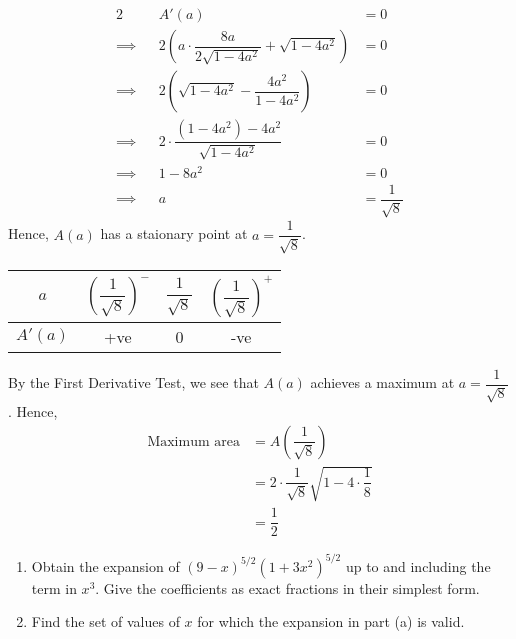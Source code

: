 \documentclass{jhwhw}
\begin{document}
        \begin{alignat*}{2}
            &&A'(a) &= 0\\
            \implies&&2\left(a \cdot \dfrac{8a}{2\sqrt{1-4a^2}} + \sqrt{1 - 4a^2}\right) &= 0\\
            \implies&&2\left(\sqrt{1 - 4a^2} - \dfrac{4a^2}{1-4a^2}\right) &= 0\\
            \implies&&2 \cdot \dfrac{\left(1-4a^2\right) - 4a^2}{\sqrt{1-4a^2}} &= 0\\
            \implies&&1 - 8a^2 &= 0\\
            \implies&&a &= \dfrac1{\sqrt8}
        \end{alignat*}
        Hence, $A(a)$ has a staionary point at $a = \dfrac1{\sqrt8}$.
        \begin{table}[H]
            \centering
            \begin{tabular}{|c|c|c|c|}
            \hline
            $a$ & $\left(\dfrac1{\sqrt8}\right)^-$ & $\dfrac1{\sqrt8}$ & $\left(\dfrac1{\sqrt8}\right)^+$ \\\hline
            $A'(a)$ & +ve   & 0 & -ve   \\\hline
            \end{tabular}
        \end{table}
        \noindent By the First Derivative Test, we see that $A(a)$ achieves a maximum at $a = \dfrac1{\sqrt8}$. Hence,
        \begin{align*}
            \text{Maximum area} &= A\left(\dfrac1{\sqrt8}\right)\\
            &= 2\cdot\dfrac1{\sqrt8}\sqrt{1 - 4\cdot\dfrac18}\\
            &= \dfrac12 
        \end{align*}


    \problem{}
        \begin{enumerate}
            \item Obtain the expansion of $(9 - x)^{5/2}\left(1 + 3x^2\right)^{5/2}$ up to and including the term in $x^3$. Give the coefficients as exact fractions in their simplest form.
            \item Find the set of values of $x$ for which the expansion in part (a) is valid.
        \end{enumerate}

    \solution
\end{document}
